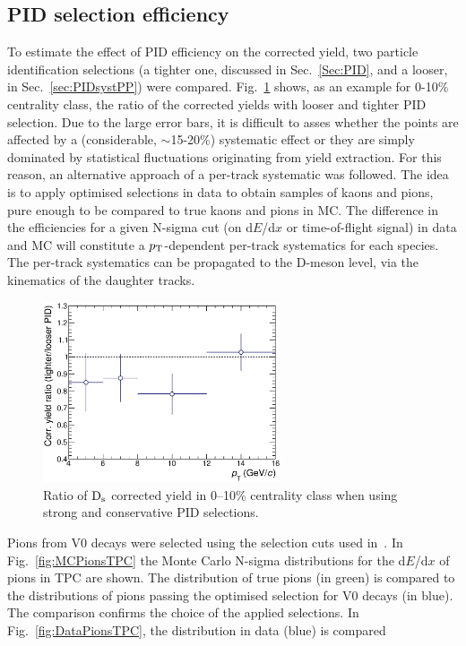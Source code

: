 \subsection{PID selection efficiency}
To estimate the effect of PID efficiency on the corrected yield, 
two particle identification selections (a tighter one, discussed in Sec.~\ref{Sec:PID}, and a 
looser, in Sec.~\ref{sec:PIDsystPP}) were compared. Fig.~\ref{fig:DsPID010} 
shows, as an example for 0-10\% centrality class, the ratio of the corrected yields 
with looser and tighter PID selection. Due to the large error bars, it is difficult to asses
whether the points are affected by a (considerable, $\sim$15-20\%) systematic effect
or they are simply dominated by statistical fluctuations originating from
yield extraction. For this reason, an alternative approach of a per-track 
systematic was followed. The idea is to apply optimised selections in data to obtain
samples of kaons and pions, pure enough to be compared to true kaons and pions
in MC. The difference in the efficiencies for a given N-sigma cut (on d$E$/d$x$ or 
time-of-flight signal) in data and MC will
constitute a $p_{\rm T}$-dependent per-track systematics for each species.
The per-track systematics can be propagated to the D-meson level, via the kinematics of
the daughter tracks.
\begin{figure}[!h]
 \centering
 \includegraphics[angle=0, width=7cm]{./FigCap5/PIDsyst_010.eps}
 \caption{Ratio of ${\rm D_s}$ corrected yield in 0--10\% centrality class when using strong and conservative PID selections.}
 \label{fig:DsPID010} 
\end{figure}
Pions from V0 decays were selected using the selection cuts
used in~\cite{Schuchmann:2102194}. In Fig.~\ref{fig:MCPionsTPC} the Monte Carlo 
N-sigma distributions for the d$E$/d$x$ of pions in TPC are shown.
The distribution of true pions (in green) is compared to the
distributions of pions passing the optimised selection for V0 decays 
(in blue). The comparison confirms the choice of the applied selections.
In Fig.~\ref{fig:DataPionsTPC}, the distribution in data (blue) is compared
